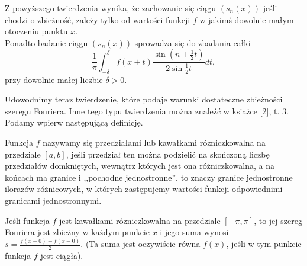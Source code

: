 \documentclass[leqno]{article}
\begin{document}
\begin{justify}
\begin{uwaga}
    Z powyższego twierdzenia wynika, że zachowanie się ciągu $(s_n(x))$ jeśli chodzi o zbieżność, zależy tylko od wartości funkcji $f$ w jakimś dowolnie małym otoczeniu punktu $x$. \\
    Ponadto badanie ciągu $(s_n(x))$ sprowadza się do zbadania całki 
    \[
        \frac{1}{\pi} \int_{-\delta}^{\delta}f(x + t) \frac{ \sin (n + \frac{1}{2}t)}{2 \sin \frac{1}{2}t}dt,
    \]
    przy dowolnie małej liczbie $\delta > 0$. 
\end{uwaga}

Udowodnimy teraz twierdzenie, które podaje warunki dostateczne zbieżności szeregu Fouriera. Inne tego typu twierdzenia można znaleźć w ksiażce [2], t. 3. Podamy wpierw następującą definicję.

\begin{defn}
    Funkcja $f$ nazywamy się przedziałami lub kawałkami rózniczkowalna na przedziale $[a,b]$, jeśli przedział ten można podzielić na skończoną liczbę przedziałów domkniętych,
    wewnątrz których jest ona różniczkowalna, a na końcach ma granice i ,,pochodne jednostronne'', to znaczy granice jednostronne ilorazów różnicowych, w których zastępujemy wartości funkcji odpowiednimi granicami jednostronnymi. 
\end{defn}

\begin{theorem}
{
    Jeśli funkcja $f$ jest kawałkami rózniczkowalna na przedziale $[-\pi, \pi]$, to jej szereg Fouriera jest zbieżny w każdym punkcie $x$ i jego suma wynosi $s = \frac{f(x+0) + f(x - 0)}{2}$.
    (Ta suma jest oczywiście równa $f(x)$, jeśli w tym punkcie funkcja $f$ jest ciągła).
}
\end{theorem}


\end{justify}
\end{document}
